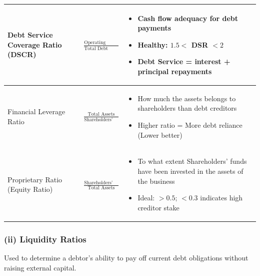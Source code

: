 \documentclass[12pt]{article}
\begin{document}
\begin{longtable}{|>{\raggedright\arraybackslash}m{4.5cm}|>{\raggedright\arraybackslash}m{5cm}|>{\raggedright\arraybackslash}m{6cm}|}
Debt Service Coverage Ratio (DSCR) & 
$\frac{\text{Operating Profit}}{\text{Total Debt Service}}$ &
\begin{itemize}
\item Cash flow adequacy for debt payments
\item Healthy: $1.5<$ DSR $<2$
\item Debt Service = interest + principal repayments 
\end{itemize} \\
\hline

Financial Leverage Ratio & 
$\frac{\text{Total Assets}}{\text{Shareholders' Equity}}$ &
\begin{itemize}
\item How much the assets belongs to shareholders than debt creditors
\item Higher ratio = More debt reliance (Lower better)
\end{itemize} \\
\hline

Proprietary Ratio (Equity Ratio) & 
$\frac{\text{Shareholders' Funds}}{\text{Total Assets}}$ &
\begin{itemize}
\item To what extent Shareholders' funds have been invested in the assets of the business
\item Ideal: $>0.5$; $<0.3$ indicates high creditor stake
\end{itemize} \\
\hline
\end{longtable}

\subsubsection*{(ii) Liquidity Ratios}

Used to determine a debtor's ability to pay off current debt obligations without raising external capital.
\end{document}

